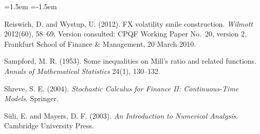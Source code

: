 \documentclass[11pt]{article}
\theoremstyle{remark}
\begin{document}
\begin{list}{}{\leftmargin=1.5em \itemindent=-1.5em \itemsep=2pt \parsep=0pt}
\item Reiswich, D. and Wystup, U. (2012). FX volatility smile construction. \emph{Wilmott} 2012(60), 58--69. Version consulted: CPQF Working Paper No.~20, version 2, Frankfurt School of Finance \& Management, 20 March 2010.
\item Sampford, M. R. (1953). Some inequalities on Mill's ratio and related functions. \emph{Annals of Mathematical Statistics} 24(1), 130--132.
\item Shreve, S. E. (2004). \emph{Stochastic Calculus for Finance II: Continuous-Time Models}. Springer.
\item S\"uli, E. and Mayers, D. F. (2003). \emph{An Introduction to Numerical Analysis}. Cambridge University Press.
\end{list}
\end{document}
